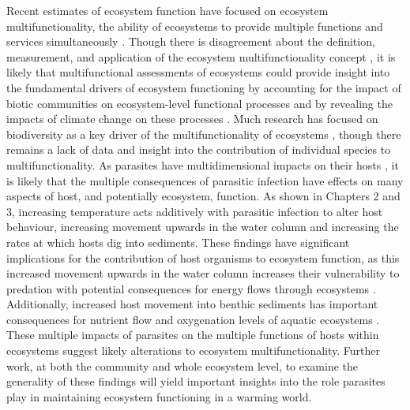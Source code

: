 Recent estimates of ecosystem function have focused on ecosystem multifunctionality, the ability of ecosystems to provide multiple functions and services simultaneously \citep{manning2018}. Though there is disagreement about the definition, measurement, and application of the ecosystem multifunctionality concept \citep{gamfeldt2017, manning2018, meyer2018}, it is likely that multifunctional assessments of ecosystems could provide insight into the fundamental drivers of ecosystem functioning by accounting for the impact of biotic communities on ecosystem-level functional processes \citep{manning2018} and by revealing the impacts of climate change on these processes \citep{traill2010}. Much research has focused on biodiversity as a key driver of the multifunctionality of ecosystems \citep{gamfeldt2017, meyer2018}, though there remains a lack of data and insight into the contribution of individual species to multifunctionality. As parasites have multidimensional impacts on their hosts \citep{thomas2010, cezilly2013}, it is likely that the multiple consequences of parasitic infection have effects on many aspects of host, and potentially ecosystem, function. As shown in Chapters 2 and 3, increasing temperature acts additively with parasitic infection to alter host behaviour, increasing movement upwards in the water column and increasing the rates at which hosts dig into sediments. These findings have significant implications for the contribution of host organisms to ecosystem function, as this increased movement upwards in the water column increases their vulnerability to predation \citep{jacquin2014} with potential consequences for energy flows through ecosystems \citep{buck2017}. Additionally, increased host movement into benthic sediments has important consequences for nutrient flow and oxygenation levels of aquatic ecosystems \citep{baranov2016, wohlgemuth2017}. These multiple impacts of parasites on the multiple functions of hosts within ecosystems suggest likely alterations to ecosystem multifunctionality. Further work, at both the community and whole ecosystem level, to examine the generality of these findings will yield important insights into the role parasites play in maintaining ecosystem functioning in a warming world. 

